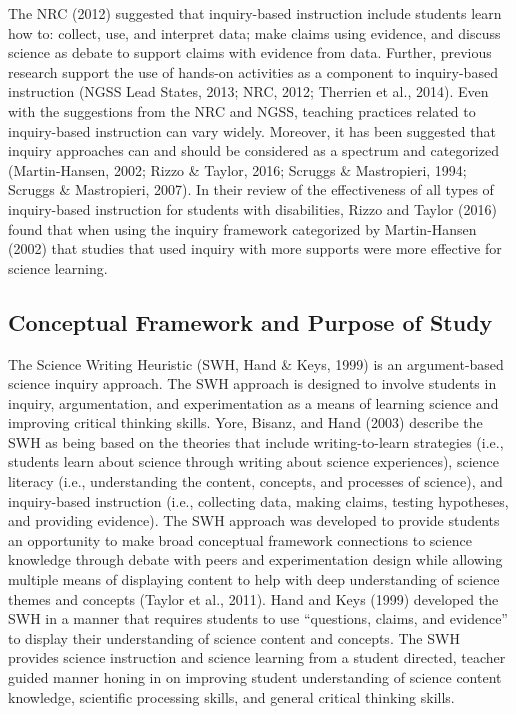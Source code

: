\documentclass[11.5pt]{sig-alternate} %
\begin{document}
\begin{large}
The NRC (2012) suggested that inquiry-based instruction include students learn how to: collect, use, and interpret data; make claims using evidence, and discuss science as debate to support claims with evidence from data.  Further, previous research support the use of hands-on activities as a component to inquiry-based instruction (NGSS Lead States, 2013; NRC, 2012; Therrien et al., 2014). Even with the suggestions from the NRC and NGSS, teaching practices related to inquiry-based instruction can vary widely.  Moreover, it has been suggested that inquiry approaches can and should be considered as a spectrum and categorized (Martin-Hansen, 2002; Rizzo \& Taylor, 2016; Scruggs \& Mastropieri, 1994; Scruggs \& Mastropieri, 2007).  In their review of the effectiveness of all types of inquiry-based instruction for students with disabilities, Rizzo and Taylor (2016) found that when using the inquiry framework categorized by Martin-Hansen (2002) that studies that used inquiry with more supports were more effective for science learning.

\subsection*{Conceptual Framework and Purpose of Study}

The Science Writing Heuristic (SWH, Hand \& Keys, 1999) is an argument-based science inquiry approach.  The SWH approach is designed to involve students in inquiry, argumentation, and experimentation as a means of learning science and improving critical thinking skills.  Yore, Bisanz, and Hand (2003) describe the SWH as being based on the theories that include writing-to-learn strategies (i.e., students learn about science through writing about science experiences), science literacy (i.e., understanding the content, concepts, and processes of science), and inquiry-based instruction (i.e., collecting data, making claims, testing hypotheses, and providing evidence).  The SWH approach was developed to provide students an opportunity to make broad conceptual framework connections to science knowledge through debate with peers and experimentation design while allowing multiple means of displaying content to help with deep understanding of science themes and concepts (Taylor et al., 2011).  Hand and Keys (1999) developed the SWH in a manner that requires students to use “questions, claims, and evidence” to display their understanding of science content and concepts.  The SWH provides science instruction and science learning from a student directed, teacher guided manner honing in on improving student understanding of science content knowledge, scientific processing skills, and general critical thinking skills.


\end{large}
\end{document}
